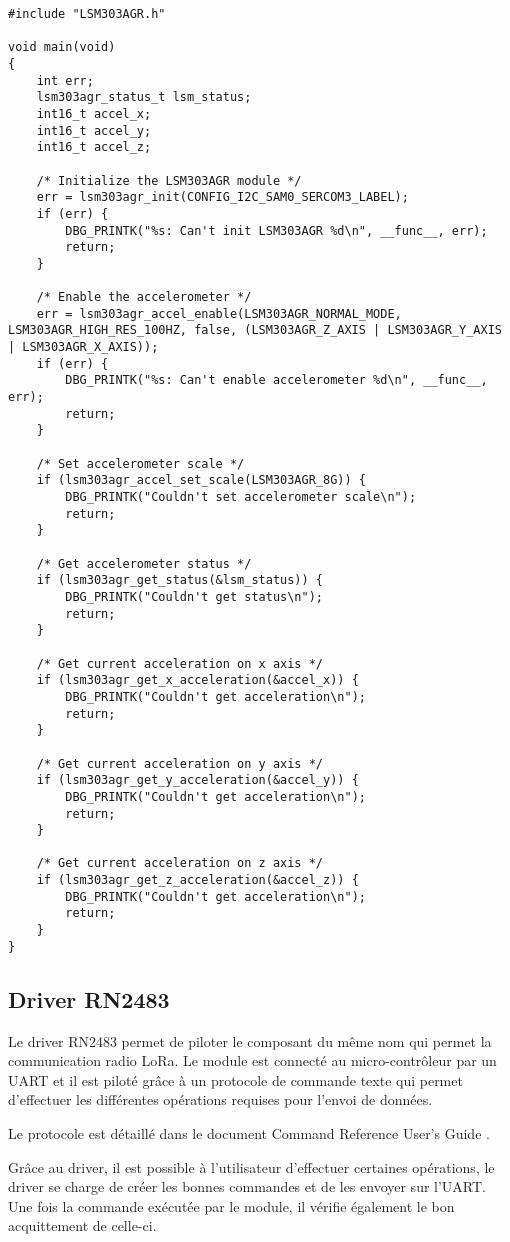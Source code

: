 \begin{lstlisting}[style=CStyle]
#include "LSM303AGR.h"

void main(void)
{
	int err;
	lsm303agr_status_t lsm_status;
	int16_t accel_x;
	int16_t accel_y;
	int16_t accel_z;

	/* Initialize the LSM303AGR module */
	err = lsm303agr_init(CONFIG_I2C_SAM0_SERCOM3_LABEL);
	if (err) {
		DBG_PRINTK("%s: Can't init LSM303AGR %d\n", __func__, err);
		return;
	}

	/* Enable the accelerometer */
	err = lsm303agr_accel_enable(LSM303AGR_NORMAL_MODE, LSM303AGR_HIGH_RES_100HZ, false, (LSM303AGR_Z_AXIS | LSM303AGR_Y_AXIS | LSM303AGR_X_AXIS));
	if (err) {
		DBG_PRINTK("%s: Can't enable accelerometer %d\n", __func__, err);
		return;
	}

	/* Set accelerometer scale */
	if (lsm303agr_accel_set_scale(LSM303AGR_8G)) {
		DBG_PRINTK("Couldn't set accelerometer scale\n");
		return;
	}
	
	/* Get accelerometer status */
	if (lsm303agr_get_status(&lsm_status)) {
		DBG_PRINTK("Couldn't get status\n");
		return;	
	}
	
	/* Get current acceleration on x axis */	
	if (lsm303agr_get_x_acceleration(&accel_x)) {
		DBG_PRINTK("Couldn't get acceleration\n");
		return;		
	}

	/* Get current acceleration on y axis */	
	if (lsm303agr_get_y_acceleration(&accel_y)) {
		DBG_PRINTK("Couldn't get acceleration\n");
		return;		
	}
	
	/* Get current acceleration on z axis */	
	if (lsm303agr_get_z_acceleration(&accel_z)) {
		DBG_PRINTK("Couldn't get acceleration\n");
		return;		
	}	
}
\end{lstlisting}

\subsection{Driver RN2483}

Le driver RN2483 permet de piloter le composant du même nom qui permet la communication radio LoRa. Le module est connecté au micro-contrôleur par un UART et il est piloté grâce à un protocole de commande texte qui permet d'effectuer les différentes opérations requises pour l'envoi de données.

Le protocole est détaillé dans le document Command Reference User's Guide \cite{rn2483-datasheet}.

Grâce au driver, il est possible à l'utilisateur d'effectuer certaines opérations, le driver se charge de créer les bonnes commandes et de les envoyer sur l'UART. Une fois la commande exécutée par le module, il vérifie également le bon acquittement de celle-ci.

